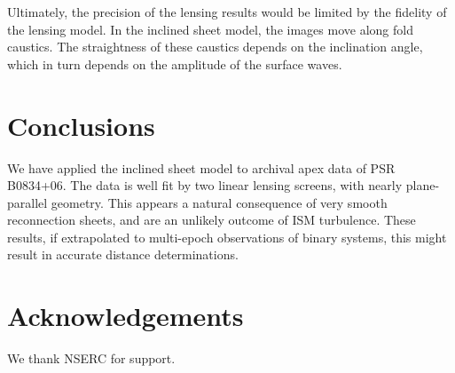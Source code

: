 \documentclass[useAMS,usenatbib]{mn2e}
\begin{document}
Ultimately, the precision of the lensing results would be limited by
the fidelity of the lensing model.  In the inclined sheet model, the
images move along fold caustics.  The straightness of these caustics
depends on the inclination angle, which in turn depends on the
amplitude of the surface waves.  

\section{Conclusions}

We have applied the \citep{2014MNRAS.442.3338P} inclined
sheet model to archival apex data of PSR B0834+06.  The data is well
fit by two linear lensing screens, with nearly plane-parallel
geometry.  This appears a natural consequence of very smooth
reconnection sheets, and are an unlikely outcome of ISM turbulence.
These results, if extrapolated to multi-epoch observations of binary
systems, this might result in accurate distance determinations.


\section{Acknowledgements}

We thank NSERC for support.


\newcommand{\araa}{ARA\&A}   %
\newcommand{\afz}{Afz}       %
\newcommand{\aj}{AJ}         %
\newcommand{\azh}{AZh}       %
\newcommand{\aaa}{A\&A}      %
\newcommand{\aas}{A\&AS}     %
\newcommand{\aar}{A\&AR}     %
\newcommand{\apj}{ApJ}       %
\newcommand{\apjs}{ApJS}     %
\newcommand{\apjl}{ApJ}      %
\newcommand{\apss}{Ap\&SS}   %
\newcommand{\baas}{BAAS}     %
\newcommand{\jaa}{JA\&A}     %
\newcommand{\mnras}{MNRAS}   %
\newcommand{\nat}{Nat}       %
\newcommand{\pasj}{PASJ}     %
\newcommand{\pasp}{PASP}     %
\newcommand{\paspc}{PASPC}   %
\newcommand{\qjras}{QJRAS}   %
\newcommand{\sci}{Sci}       %
\newcommand{\solphys}{Solar Physics}       %
\newcommand{\sova}{SvA}      %
\newcommand{\aap}{A\&A}
\newcommand\jcap{{J. Cosmology Astropart. Phys.}}%
\newcommand{\prd}{Phys. Rev. D}






\label{lastpage}
\end{document}
